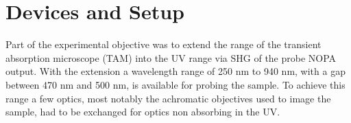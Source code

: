 \documentclass[twoside,openright]{scrreprt}
\begin{document}







\chapter{Devices and Setup}



Part of the experimental objective was to extend the range of the transient absorption microscope (TAM) into the UV range via SHG of the probe NOPA output. With the extension a wavelength range of 250 nm to 940 nm, with a gap between 470 nm and 500 nm, is available for probing the sample.\newline
To achieve this range a few optics, most notably the achromatic objectives used to image the sample, had to be exchanged for optics non absorbing in the UV.
\end{document}
